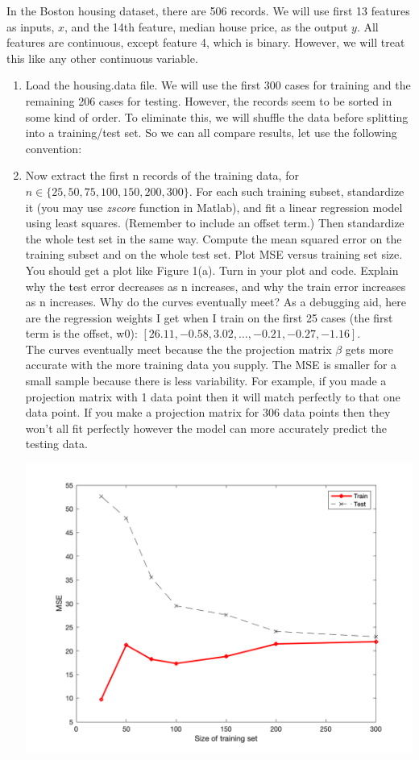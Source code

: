 \documentclass[11pt]{article}
\newcommand{\mfile}[1]  {{\small }} %
\begin{document}
In the Boston housing dataset, there are 506 records. We will
use first 13 features as inputs, $x$, and the 14th feature, median house price, as the output $y$. All features are continuous,
except feature 4, which is binary. However, we will treat this like any other continuous variable.
\begin{enumerate}
	\item Load the housing.data file. We will use the first 300 cases for training and the remaining 206 cases for
	testing. However, the records seem to be sorted in some kind of order. To eliminate this, we will shuffle the data
	before splitting into a training/test set. So we can all compare results, let use the following convention:
	\mfile{sample.m}
	\item Now extract the first n records of the training data, for $n \in \{25, 50, 75, 100, 150, 200, 300\}$. For each such
	training subset, standardize it (you may use \textit{zscore} function in Matlab), and fit a linear regression model using least squares. (Remember to include
	an offset term.) Then standardize the whole test set in the same way. Compute the mean squared error on
	the training subset and on the whole test set. Plot MSE versus training set size. You should get a plot like
	Figure 1(a). Turn in your plot and code. Explain why the test error decreases as n increases, and why the train
	error increases as n increases. Why do the curves eventually meet?
	As a debugging aid, here are the regression weights I get when I train on the first 25 cases (the first term is the
	offset, w0): $[26.11, -0.58, 3.02,\dots,-0.21, -0.27, -1.16]$.\\
	
	The curves eventually meet because the the projection matrix $\beta$ gets more accurate with the more training data you supply. The MSE is smaller for a small sample because there is less variability. For example, if you made a projection matrix with 1 data point then it will match perfectly to that one data point. If you make a projection matrix for 306 data points then they won't all fit perfectly however the model can more accurately predict the testing data. 
	
\includegraphics[scale=.35]{housing_least_squares.png}
	

\end{enumerate}
\end{document}
